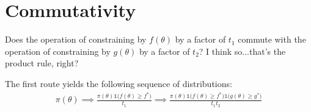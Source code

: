 \documentclass[a4paper, 12pt]{article}
\begin{document}

\section{Commutativity}
Does the operation of constraining by $f(\theta)$ by a factor of $t_1$
commute with the operation of constraining by $g(\theta)$ by a factor
of $t_2$? I think so...that's the product rule, right?

The first route yields the following sequence of distributions:
\begin{align}
\pi(\theta)
    \implies
\frac{\pi(\theta)\mathds{1}\big(f(\theta) \geq f^*\big)}{t_1}
    \implies
\frac{\pi(\theta)\mathds{1}\big(f(\theta) \geq f^*\big)\mathds{1}\big(g(\theta) \geq g^*\big)}{t_1t_2}
\end{align}
\end{document}

